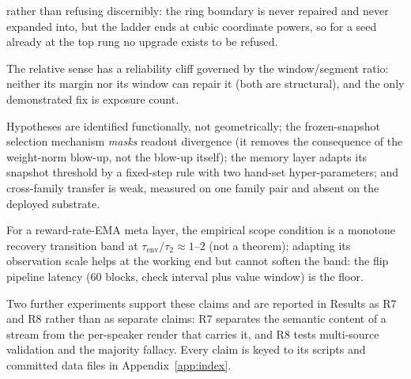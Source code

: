 \documentclass[preprint,12pt]{elsarticle}
\begin{document}
\begin{description}[leftmargin=1.6em,style=nextline]
rather than refusing discernibly: the ring boundary is never repaired and
never expanded into, but the ladder ends at cubic coordinate powers, so for a
seed already at the top rung no upgrade exists to be refused.
\item[R4 (bounds of the capacity sense).] The relative sense has a
reliability cliff governed by the window/segment ratio: neither its
margin nor its window can repair it (both are structural), and the only
demonstrated fix is exposure count.
\item[R5 (the memory layer).] Hypotheses are identified functionally, not
geometrically; the frozen-snapshot selection mechanism \emph{masks} readout
divergence (it removes the consequence of the weight-norm blow-up, not the
blow-up itself); the memory layer adapts its snapshot threshold by a
fixed-step rule with two hand-set hyper-parameters; and cross-family transfer is weak, measured on one
family pair and absent on the deployed substrate.
\item[R6 (the meta timescale).] For a reward-rate-EMA meta layer, the
empirical scope condition is a monotone recovery transition band at
$\tau_{\mathrm{env}}/\tau_2\approx1$--$2$ (not a theorem);
adapting its observation scale helps at the working end but cannot soften
the band: the flip pipeline latency ($60$ blocks, check interval plus
value window) is the floor.
\end{description}

Two further experiments support these claims and are reported in Results as
R7 and R8 rather than as separate claims: R7 separates the semantic content
of a stream from the per-speaker render that carries it, and R8 tests
multi-source validation and the majority fallacy. Every claim is keyed to
its scripts and committed data files in Appendix~\ref{app:index}.
\end{document}
